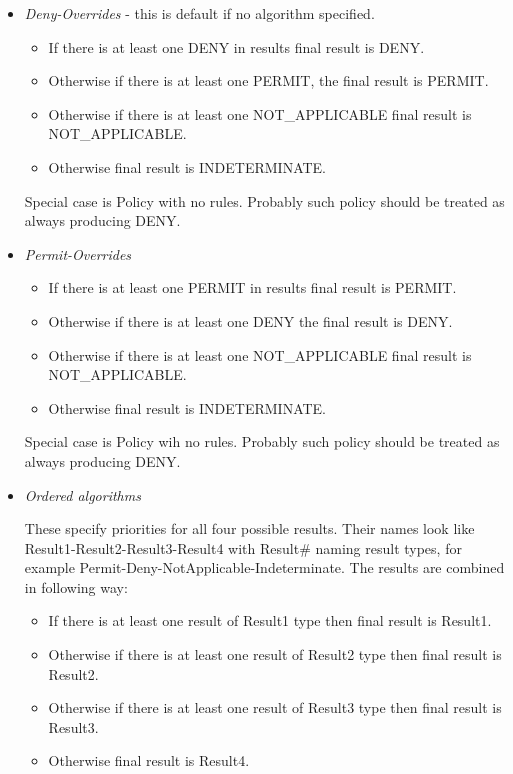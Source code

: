 \documentclass{article}                            %
\begin{document}
\begin{itemize}
    \item  \emph{Deny-Overrides} - this is default if no algorithm specified.

    \begin{itemize}
        \item If there is at least one DENY in results final result is DENY.
        \item Otherwise if there is at least one PERMIT, the final result is PERMIT.
        \item Otherwise if there is at least one NOT\_APPLICABLE final result is NOT\_APPLICABLE.
        \item Otherwise final result is INDETERMINATE.
    \end{itemize}

    Special case is Policy with no rules. Probably such policy should be treated as always producing DENY.

    \item  \emph{Permit-Overrides}

    \begin{itemize}
        \item If there is at least one PERMIT in results final result is PERMIT.
        \item Otherwise if there is at least one DENY the final result is DENY.
        \item Otherwise if there is at least one NOT\_APPLICABLE final result is NOT\_APPLICABLE.
        \item Otherwise final result is INDETERMINATE.
    \end{itemize}

    Special case is Policy wih no rules. Probably such policy should be treated as always producing DENY.

    \item  \emph{Ordered algorithms}

These specify priorities for all four possible results. Their names look like Result1-Result2-Result3-Result4 with Result\# naming result types, for example Permit-Deny-NotApplicable-Indeterminate. The results are combined in following way:

    \begin{itemize}
        \item If there is at least one result of Result1 type then final result is Result1.
        \item Otherwise if there is at least one result of Result2 type then final result is Result2.
        \item Otherwise if there is at least one result of Result3 type then final result is Result3.
        \item Otherwise final result is Result4.
    \end{itemize}


\end{itemize}
\end{document}
